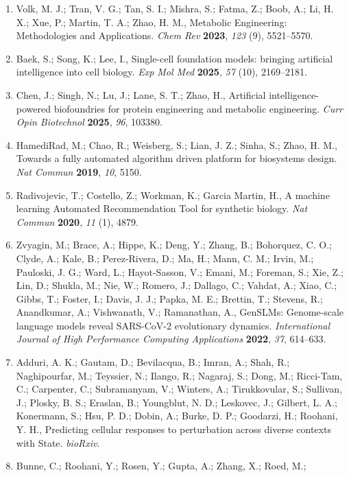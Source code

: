 \begin{enumerate}\footnotesize
  \item Volk, M. J.; Tran, V. G.; Tan, S. I.; Mishra, S.; Fatma, Z.; Boob, A.; Li,
    H. X.; Xue, P.; Martin, T. A.; Zhao, H. M., Metabolic Engineering: Methodologies
    and Applications. \emph{Chem Rev} \textbf{2023}, \emph{123} (9), 5521--5570.
  \item Baek, S.; Song, K.; Lee, I., Single-cell foundation models: bringing
    artificial intelligence into cell biology. \emph{Exp Mol Med} \textbf{2025},
    \emph{57} (10), 2169--2181.
  \item Chen, J.; Singh, N.; Lu, J.; Lane, S. T.; Zhao, H., Artificial
    intelligence-powered biofoundries for protein engineering and metabolic
    engineering. \emph{Curr Opin Biotechnol} \textbf{2025}, \emph{96}, 103380.
  \item HamediRad, M.; Chao, R.; Weisberg, S.; Lian, J. Z.; Sinha, S.; Zhao, H. M.,
    Towards a fully automated algorithm driven platform for biosystems design.
    \emph{Nat Commun} \textbf{2019}, \emph{10}, 5150.
  \item Radivojevic, T.; Costello, Z.; Workman, K.; Garcia Martin, H., A machine
    learning Automated Recommendation Tool for synthetic biology. \emph{Nat Commun}
    \textbf{2020}, \emph{11} (1), 4879.
  \item Zvyagin, M.; Brace, A.; Hippe, K.; Deng, Y.; Zhang, B.; Bohorquez, C. O.;
    Clyde, A.; Kale, B.; Perez-Rivera, D.; Ma, H.; Mann, C. M.; Irvin, M.; Pauloski,
    J. G.; Ward, L.; Hayot-Sasson, V.; Emani, M.; Foreman, S.; Xie, Z.; Lin, D.;
    Shukla, M.; Nie, W.; Romero, J.; Dallago, C.; Vahdat, A.; Xiao, C.; Gibbs, T.;
    Foster, I.; Davis, J. J.; Papka, M. E.; Brettin, T.; Stevens, R.; Anandkumar,
    A.; Vishwanath, V.; Ramanathan, A., GenSLMs: Genome-scale language models reveal
    SARS-CoV-2 evolutionary dynamics. \emph{International Journal of High
    Performance Computing Applications} \textbf{2022}, \emph{37}, 614--633.
  \item Adduri, A. K.; Gautam, D.; Bevilacqua, B.; Imran, A.; Shah, R.;
    Naghipourfar, M.; Teyssier, N.; Ilango, R.; Nagaraj, S.; Dong, M.; Ricci-Tam,
    C.; Carpenter, C.; Subramanyam, V.; Winters, A.; Tirukkovular, S.; Sullivan,
    J.; Plosky, B. S.; Eraslan, B.; Youngblut, N. D.; Leskovec, J.; Gilbert, L. A.;
    Konermann, S.; Hsu, P. D.; Dobin, A.; Burke, D. P.; Goodarzi, H.; Roohani, Y.
    H., Predicting cellular responses to perturbation across diverse contexts with
    State. \emph{bioRxiv}.
  \item Bunne, C.; Roohani, Y.; Rosen, Y.; Gupta, A.; Zhang, X.; Roed, M.;

\end{enumerate}

